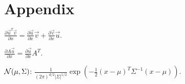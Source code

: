 \section{Appendix}


$\frac{\partial \overrightarrow{u}^T \overrightarrow{v}}{\partial x} = \frac{\partial \overrightarrow{u}}{\partial x} \overrightarrow{v} +\frac{\partial \overrightarrow{v}}{\partial x} \overrightarrow{u}$.

$\frac{\partial A\overrightarrow{u}}{\partial x} = \frac{\partial\overrightarrow{u}}{\partial x} A^T$.

$\mathcal{N}(\mu,\Sigma)$: $\frac{1}{(2\pi)^{d/2}|\Sigma|^{1/2}} \exp(-\frac{1}{2}(x-\mu)^T \Sigma^{-1} (x-\mu))$.